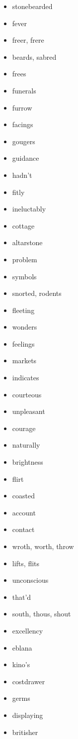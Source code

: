 \documentclass{article}
\begin{document}
\begin{itemize}
    \item stonebearded
    \item fever
    \item freer, frere
    \item beards, sabred
    \item frees
    \item funerals
    \item furrow
    \item facings
    \item gougers
    \item guidance
    \item hadn't
    \item fitly
    \item ineluctably
    \item cottage
    \item altarstone
    \item problem
    \item symbols
    \item snorted, rodents
    \item fleeting
    \item wonders
    \item feelings
    \item markets
    \item indicates
    \item courteous
    \item unpleasant
    \item courage
    \item naturally
    \item brightness
    \item flirt
    \item coasted
    \item account
    \item contact
    \item wroth, worth, throw
    \item lifts, flits
    \item unconscious
    \item that'd
    \item south, thous, shout
    \item excellency
    \item eblana
    \item kino's
    \item costdrawer
    \item germs
    \item displaying
    \item britisher

\end{itemize}
\end{document}
